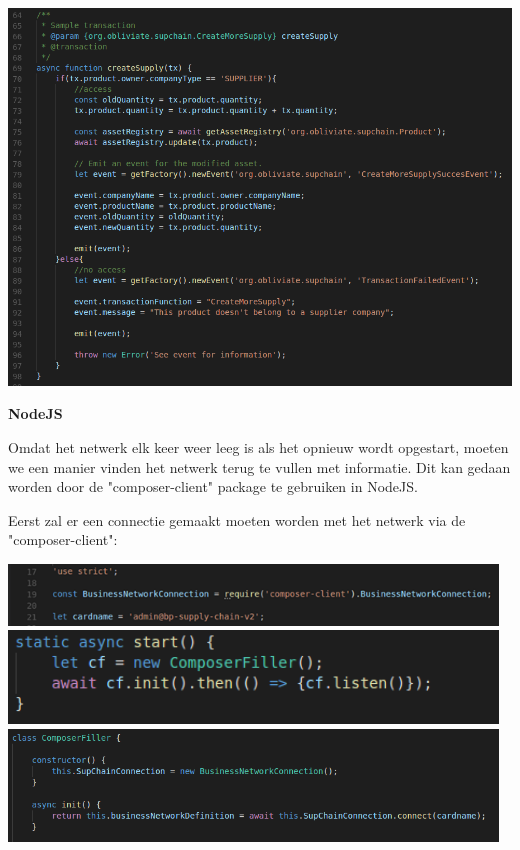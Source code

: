 \documentclass[fleqn,a4paper,12pt]{book}
\begin{document}
\begin{center}
	\includegraphics[width=14cm]{img/logic-example}\\[1cm]
\end{center}

\textbf{NodeJS}

Omdat het netwerk elk keer weer leeg is als het opnieuw wordt opgestart, moeten we een manier vinden het netwerk terug te vullen met informatie. Dit kan gedaan worden door de "composer-client" package te gebruiken in NodeJS.

Eerst zal er een connectie gemaakt moeten worden met het netwerk via de "composer-client":
\begin{center}
	\includegraphics[width=13cm]{img/composer-info}\\[1cm]
	\includegraphics[width=13cm]{img/composer-start}\\[1cm]
	\includegraphics[width=13cm]{img/composer-connect}\\[1cm]
\end{center}
\end{document}
